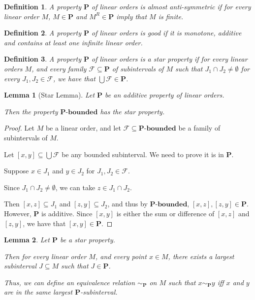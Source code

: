 \documentclass{article}
\newtheorem{lemma}{Lemma}
\newtheorem{definition}{Definition}
\newcommand{\bounded}[1]{{#1} \text{-} \mathbf{bounded}}
\newcommand{\pp}{\mathbf{P}}
\begin{document}
\begin{definition}
  A property $\pp$ of linear orders is \emph{almost anti-symmetric}
  if for every linear order $M$,
  $M \in \pp$ and $M^R \in \pp$ imply that $M$ is finite.
\end{definition}

\begin{definition}
  A property $\pp$ of linear orders is \emph{good} if it is
  monotone, additive and contains at least one infinite linear order.
\end{definition}

\begin{definition}
  A property $\pp$ of linear orders is a \emph{star property} if
  for every linear orders $M$, and every family $\mathcal{F} \subseteq \pp$
  of subintervals of $M$ such that $J_1 \cap J_2 \ne \emptyset$
  for every $J_1, J_2 \in \mathcal{F}$, we have that
  $\bigcup \mathcal{F} \in \pp$.
\end{definition}


\begin{lemma}[Star Lemma]
  Let $\pp$ be an additive property of linear orders.

  Then the property $\bounded{\pp}$ has the star property.
\end{lemma}

\begin{proof}
  Let $M$ be a linear order,
  and let $\mathcal{F} \subseteq \bounded{\pp}$ be a family of subintervals of $M$.

  Let $[x, y] \subseteq \bigcup \mathcal{F}$ be any bounded subinterval. We need to prove
  it is in $\pp$.

  Suppose $x \in J_1$ and $y \in J_2$ for $J_1, J_2 \in \mathcal{F}$.

  Since $J_1 \cap J_2 \ne \emptyset$, we can take $z \in J_1 \cap J_2$.

  Then $[x, z] \subseteq J_1$ and $[z, y] \subseteq J_2$,
  and thus by $\bounded{\pp}$, $[x, z], [z, y] \in \pp$.
  However, $\pp$ is additive. Since $[x, y]$ is either the sum
  or difference of $[x, z]$ and $[z, y]$, we have that $[x, y] \in \pp$.
\end{proof}

\begin{lemma}
  Let $\pp$ be a star property.

  Then for every linear order $M$,
  and every point $x \in M$, there exists a largest subinterval $J \subseteq M$ such that
  $J \in \pp$.

  Thus, we can define an equivalence relation $\sim_{\pp}$ on $M$ such that
  $x \sim_{\pp} y$ iff $x$ and $y$ are in the same largest $\pp$-subinterval.
\end{lemma}
\end{document}
